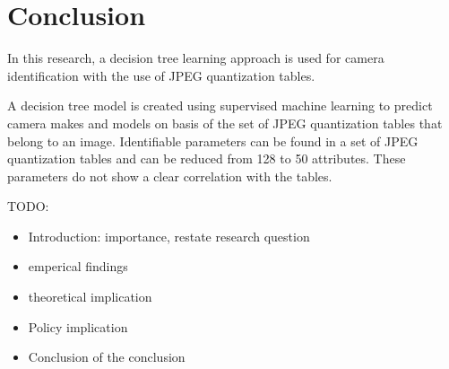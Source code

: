 \chapter{Conclusion} %
\label{ch:cncl} %


In this research, a decision tree learning approach is used for camera identification with the use of JPEG quantization tables. 

 A decision tree model is created using supervised machine learning to predict camera makes and models on basis of the set of JPEG quantization tables that belong to an image. 
Identifiable parameters can be found in a set of JPEG quantization tables and can be reduced from 128 to 50 attributes. These parameters do not show a clear correlation with the tables. 

TODO:
\begin{itemize}
\item Introduction: importance, restate research question
\item emperical findings
\item theoretical implication
\item Policy implication
\item  Conclusion of the conclusion 

\end{itemize}


